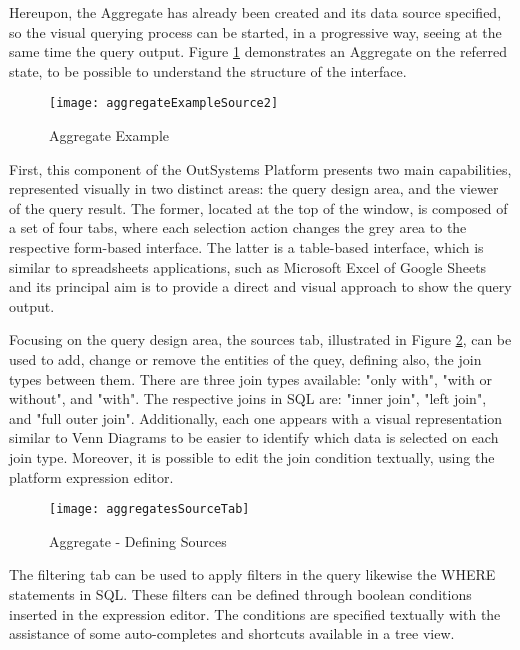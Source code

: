 
Hereupon, the Aggregate has already been created and its data source specified, so the visual querying process can be started, in a progressive way, seeing at the same time the query output. Figure \ref{fig:aggregate_created} demonstrates an Aggregate on the referred state, to be possible to understand the structure of the interface.

\begin{figure}[tb]
	\centering
	\texttt{[image: aggregateExampleSource2]}
	\caption{Aggregate Example}
	\label{fig:aggregate_created}
\end{figure}

First, this component of the OutSystems Platform presents two main capabilities, represented visually in two distinct areas: the query design area, and the viewer of the query result. The former, located at the top of the window, is composed of a set of four tabs, where each selection action changes the grey area to the respective form-based interface. The latter is a table-based interface, which is similar to spreadsheets applications, such as Microsoft Excel \cite{microsoftExcel} of Google Sheets \cite{googleSheets} and its principal aim is to provide a direct and visual approach to show the query output.

Focusing on the query design area, the sources tab, illustrated in Figure \ref{fig:aggregates_source_tab}, can be used to add, change or remove the entities of the quey, defining also, the join types between them. There are three join types available: "only with", "with or without", and "with". The respective joins in \gls{SQL} are: "inner join", "left join", and "full outer join". Additionally, each one appears with a visual representation similar to Venn Diagrams \cite{venn1880diagrams} to be easier to identify which data is selected on each join type. Moreover, it is possible to edit the join condition textually, using the platform expression editor.

\begin{figure}[tb]
	\centering
	\texttt{[image: aggregatesSourceTab]}
	\caption{Aggregate - Defining Sources}
	\label{fig:aggregates_source_tab}
\end{figure}

The filtering tab can be used to apply filters in the query likewise the WHERE statements in \gls{SQL}. These filters can be defined through boolean conditions inserted in the expression editor. The conditions are specified textually with the assistance of some auto-completes and shortcuts available in a tree view. 

